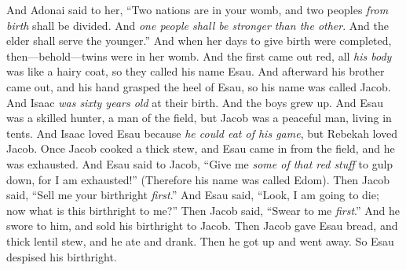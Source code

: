\begin{biblechapter}
\verse And Adonai said to her, “Two nations are in your womb, and two peoples \textit{from birth} shall be divided. And \textit{one people shall be stronger than the other}. And the elder shall serve the younger.”
\verse And when her days to give birth were completed, then—behold—twins were in her womb.
\verse And the first came out red, all \textit{his body} was like a hairy coat, so they called his name Esau.
\verse And afterward his brother came out, and his hand grasped the heel of Esau, so his name was called Jacob. And Isaac \textit{was sixty years old} at their birth.
\verse And the boys grew up. And Esau was a skilled hunter, a man of the field, but Jacob was a peaceful man, living in tents.
\verse And Isaac loved Esau because \textit{he could eat of his game}, but Rebekah loved Jacob.
\verse Once Jacob cooked a thick stew, and Esau came in from the field, and he was exhausted.
\verse And Esau said to Jacob, “Give me \textit{some of that red stuff} to gulp down, for I am exhausted!” (Therefore his name was called Edom).
\verse Then Jacob said, “Sell me your birthright \textit{first}.”
\verse And Esau said, “Look, I am going to die; now what is this birthright to me?”
\verse Then Jacob said, “Swear to me \textit{first}.” And he swore to him, and sold his birthright to Jacob.
\verse Then Jacob gave Esau bread, and thick lentil stew, and he ate and drank. Then he got up and went away. So Esau despised his birthright.
\end{biblechapter}

